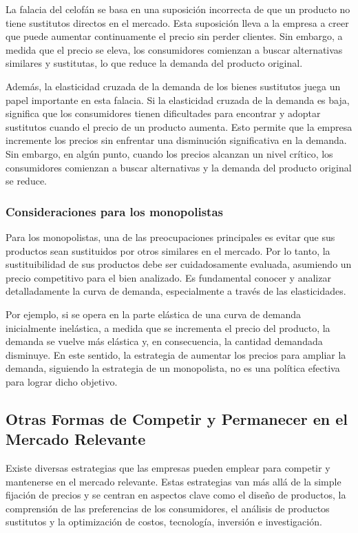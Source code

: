 \documentclass[
  doc,
  floatsintext,
  longtable,
  a4paper,
  nolmodern,
  notxfonts,
  notimes,
  12pt,
  colorlinks=true,linkcolor=blue,citecolor=blue,urlcolor=blue]{apa7}
\begin{document}
La falacia del celofán se basa en una suposición incorrecta de que un
producto no tiene sustitutos directos en el mercado. Esta suposición
lleva a la empresa a creer que puede aumentar continuamente el precio
sin perder clientes. Sin embargo, a medida que el precio se eleva, los
consumidores comienzan a buscar alternativas similares y sustitutas, lo
que reduce la demanda del producto original.

Además, la elasticidad cruzada de la demanda de los bienes sustitutos
juega un papel importante en esta falacia. Si la elasticidad cruzada de
la demanda es baja, significa que los consumidores tienen dificultades
para encontrar y adoptar sustitutos cuando el precio de un producto
aumenta. Esto permite que la empresa incremente los precios sin
enfrentar una disminución significativa en la demanda. Sin embargo, en
algún punto, cuando los precios alcanzan un nivel crítico, los
consumidores comienzan a buscar alternativas y la demanda del producto
original se reduce.

\subsubsection{Consideraciones para los
monopolistas}\label{consideraciones-para-los-monopolistas}

Para los monopolistas, una de las preocupaciones principales es evitar
que sus productos sean sustituidos por otros similares en el mercado.
Por lo tanto, la sustituibilidad de sus productos debe ser
cuidadosamente evaluada, asumiendo un precio competitivo para el bien
analizado. Es fundamental conocer y analizar detalladamente la curva de
demanda, especialmente a través de las elasticidades.

Por ejemplo, si se opera en la parte elástica de una curva de demanda
inicialmente inelástica, a medida que se incrementa el precio del
producto, la demanda se vuelve más elástica y, en consecuencia, la
cantidad demandada disminuye. En este sentido, la estrategia de aumentar
los precios para ampliar la demanda, siguiendo la estrategia de un
monopolista, no es una política efectiva para lograr dicho objetivo.

\subsection{Otras Formas de Competir y Permanecer en el Mercado
Relevante}\label{otras-formas-de-competir-y-permanecer-en-el-mercado-relevante}

Existe diversas estrategias que las empresas pueden emplear para
competir y mantenerse en el mercado relevante. Estas estrategias van más
allá de la simple fijación de precios y se centran en aspectos clave
como el diseño de productos, la comprensión de las preferencias de los
consumidores, el análisis de productos sustitutos y la optimización de
costos, tecnología, inversión e investigación.
\end{document}
